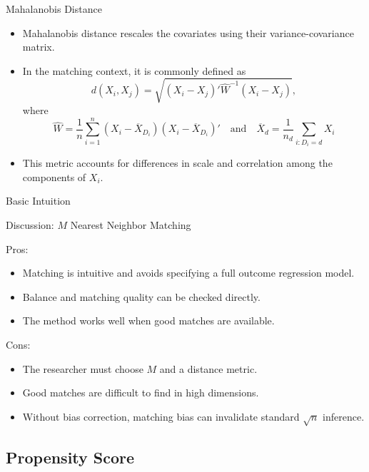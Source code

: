 \documentclass[11pt,aspectratio=169]{beamer}
\begin{document}
\begin{frame}{Mahalanobis Distance}

\begin{itemize}
    \item Mahalanobis distance rescales the covariates using their variance-covariance matrix.
    \item In the matching context, it is commonly defined as
    $$d(X_i, X_j) = \sqrt{(X_i - X_j)' \widehat{W}^{-1} (X_i - X_j)},$$
    where
    $$\widehat{W} = \frac{1}{n} \sum_{i=1}^n (X_i - \overline{X}_{D_i})(X_i - \overline{X}_{D_i})' \quad \text{and} \quad \overline{X}_d = \frac{1}{n_d} \sum_{i:D_i=d} X_i $$
    \item This metric accounts for differences in scale and correlation among the components of $X_i$.
\end{itemize}

\end{frame}


\begin{frame}{Basic Intuition}


\end{frame}


\begin{frame}{Discussion: $M$ Nearest Neighbor Matching}

Pros:
\begin{itemize}
    \item Matching is intuitive and avoids specifying a full outcome regression model.
    \item Balance and matching quality can be checked directly.
    \item The method works well when good matches are available.
\end{itemize}

Cons:
\begin{itemize}
    \item The researcher must choose $M$ and a distance metric.
    \item Good matches are difficult to find in high dimensions.
    \item Without bias correction, matching bias can invalidate standard $\sqrt{n}$ inference.
\end{itemize}

\end{frame}



\subsection{Propensity Score}
\end{document}
